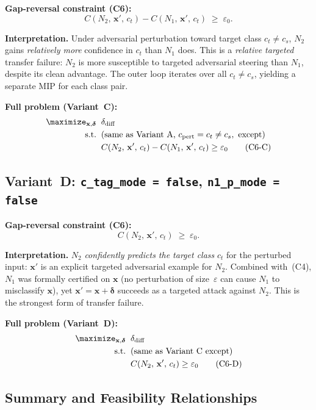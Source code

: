 \documentclass[11pt,a4paper]{article}
\theoremstyle{definition}
\theoremstyle{plain}
\newcommand{\Conf}[3]{C(#1,\,#2,\,#3)}
\newcommand{\NN}[1]{N_{#1}}
\newcommand{\vx}{\mathbf{x}}
\newcommand{\ve}{\boldsymbol{\delta}}
\newcommand{\vxp}{\mathbf{x}'}
\newcommand{\eps}{\varepsilon}
\newcommand{\epszero}{\varepsilon_0}
\newcommand{\deltadiff}{\delta_{\mathrm{diff}}}
\begin{document}
\textbf{Gap-reversal constraint (C6):}
\[
  \Conf{\NN{2}}{\vxp}{c_t} - \Conf{\NN{1}}{\vxp}{c_t} \;\ge\; \epszero.
\]

\textbf{Interpretation.}
Under adversarial perturbation toward target class $c_t \ne c_s$, $\NN{2}$ gains \emph{relatively more} confidence in $c_t$ than $\NN{1}$ does. This is a \emph{relative targeted} transfer failure: $\NN{2}$ is more susceptible to targeted adversarial steering than $\NN{1}$, despite its clean advantage. The outer loop iterates over all $c_t \ne c_s$, yielding a separate MIP for each class pair.

\medskip
\noindent\textbf{Full problem (Variant~C):}
\begin{align*}
  \maximize_{\vx,\ve}\;\; & \deltadiff \\
  \mathrm{s.t.}\;\;
    & \text{(same as Variant~A, } c_{\mathrm{pert}} = c_t \ne c_s, \text{ except)} \\
    & \Conf{\NN{2}}{\vxp}{c_t} - \Conf{\NN{1}}{\vxp}{c_t} \ge \epszero \tag{C6-C}
\end{align*}

\subsection{Variant~D: \texttt{c\_tag\_mode = false}, \texttt{n1\_p\_mode = false}}

\textbf{Gap-reversal constraint (C6):}
\[
  \Conf{\NN{2}}{\vxp}{c_t} \;\ge\; \epszero.
\]

\textbf{Interpretation.}
$\NN{2}$ \emph{confidently predicts the target class} $c_t$ for the perturbed input: $\vxp$ is an explicit targeted adversarial example for $\NN{2}$. Combined with~(C4), $\NN{1}$ was formally certified on $\vx$ (no perturbation of size~$\eps$ can cause $\NN{1}$ to misclassify $\vx$), yet $\vxp = \vx+\ve$ succeeds as a targeted attack against $\NN{2}$. This is the strongest form of transfer failure.

\medskip
\noindent\textbf{Full problem (Variant~D):}
\begin{align*}
  \maximize_{\vx,\ve}\;\; & \deltadiff \\
  \mathrm{s.t.}\;\;
    & \text{(same as Variant~C except)} \\
    & \Conf{\NN{2}}{\vxp}{c_t} \ge \epszero \tag{C6-D}
\end{align*}

\subsection{Summary and Feasibility Relationships}
\end{document}
